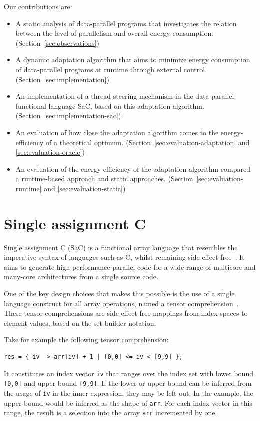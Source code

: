 \documentclass[runningheads]{llncs}
\begin{document}
Our contributions are:
\begin{itemize}
  \item A static analysis of data-parallel programs that investigates the relation between the level of parallelism and overall energy consumption.
(Section~\ref{sec:observations})
  \item A dynamic adaptation algorithm that aims to minimize energy consumption of data-parallel programs at runtime through external control.
(Section~\ref{sec:implementation})
  \item An implementation of a thread-steering mechanism in the data-parallel functional language SaC, based on this adaptation algorithm.
(Section~\ref{sec:implementation-sac})
  \item An evaluation of how close the adaptation algorithm comes to the energy-efficiency of a theoretical optimum.
(Section~\ref{sec:evaluation-adaptation} and \ref{sec:evaluation-oracle})
  \item An evaluation of the energy-efficiency of the adaptation algorithm compared a runtime-based approach and static approaches.
(Section~\ref{sec:evaluation-runtime} and
  \ref{sec:evaluation-static})
\end{itemize}

\section{Single assignment C}
Single assignment C (SaC) is a functional array language that resembles the imperative syntax of languages such as C, whilst remaining side-effect-free~\cite{grelck2006sac,grelck2012single}.
It aims to generate high-performance parallel code for a wide range of multicore and many-core architectures from a single source code.

One of the key design choices that makes this possible is the use of a single language construct for all array operations, named a tensor comprehension~\cite{scholz2021tensor}.
These tensor comprehensions are side-effect-free mappings from index spaces to element values, based on the set builder notation.

Take for example the following tensor comprehension:
\begin{verbatim}
res = { iv -> arr[iv] + 1 | [0,0] <= iv < [9,9] };
\end{verbatim}

It constitutes an index vector \texttt{iv} that ranges over the index set with lower bound \texttt{[0,0]} and upper bound \texttt{[9,9]}.
If the lower or upper bound can be inferred from the usage of \texttt{iv} in the inner expression, they may be left out.
In the example, the upper bound would be inferred as the shape of \texttt{arr}.
For each index vector in this range, the result is a selection into the array \texttt{arr} incremented by one.
\end{document}

